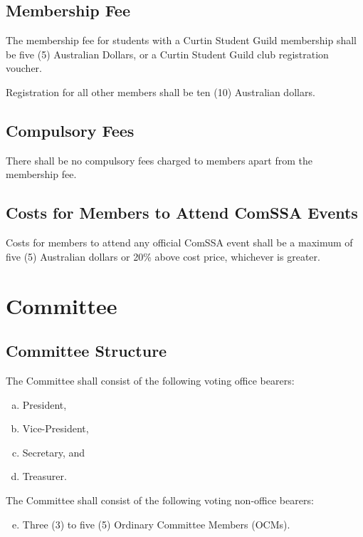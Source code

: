 \documentclass[a4paper,12pt]{article}
\begin{document}
\subsection{Membership Fee}

The membership fee for students with a Curtin Student Guild membership shall be five (5) Australian Dollars, or a Curtin Student Guild club registration voucher.

Registration for all other members shall be ten (10) Australian dollars.

\subsection{Compulsory Fees}

There shall be no compulsory fees charged to members apart from the membership fee.

\subsection{Costs for Members to Attend ComSSA Events}

Costs for members to attend any official ComSSA event shall be a maximum of five (5) Australian dollars or 20\% above cost price, whichever is greater.

\section{Committee}

\subsection{Committee Structure}

The Committee shall consist of the following voting office bearers:

\begin{enumerate}[a)]
	\item President,
	\item Vice-President,
	\item Secretary, and
	\item Treasurer.
\end{enumerate}

The Committee shall consist of the following voting non-office bearers:

\begin{enumerate}[a)]
	\setcounter{enumi}{4}
	\item Three (3) to five (5) Ordinary Committee Members (OCMs).
\end{enumerate}
\end{document}
